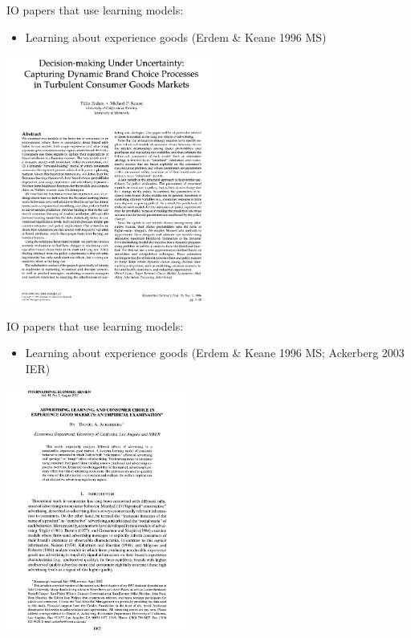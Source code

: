 \documentclass[aspectratio=169]{beamer}
\begin{document}
\begin{frame}
IO papers that use learning models:
\bigskip\par
\begin{itemize}
\itemsep1.5em
\item Learning about experience goods (Erdem \& Keane 1996 MS)
\end{itemize}
\end{frame}

\begin{frame}
\centering
\includegraphics[width=0.52\textwidth]{Erdem_Keane_1996_MS_cover.jpg}
\end{frame}

\begin{frame}
IO papers that use learning models:
\bigskip\par
\begin{itemize}
\itemsep1.5em
\item Learning about experience goods (Erdem \& Keane 1996 MS; Ackerberg 2003 IER)
\end{itemize}
\end{frame}

\begin{frame}
\centering
\includegraphics[width=0.45\textwidth]{Ackerberg_2003_IER_cover.jpg}
\end{frame}
\end{document}
